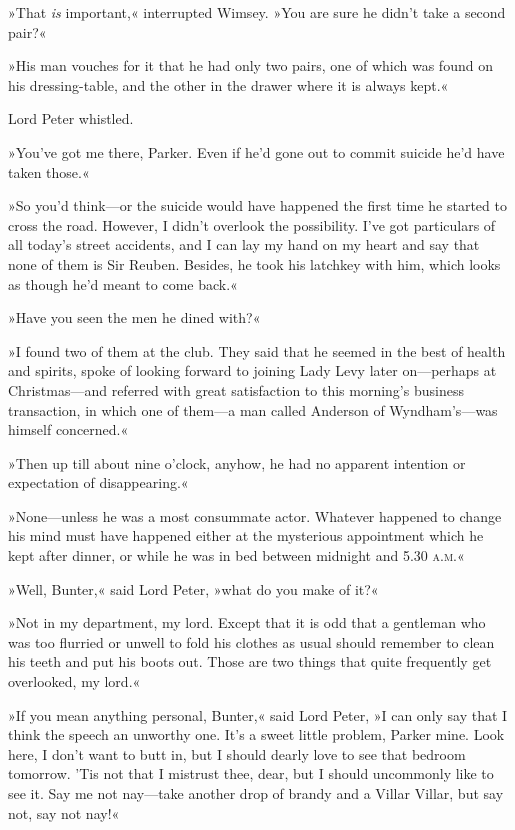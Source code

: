 »That \textit{is} important,« interrupted Wimsey. »You are sure he didn't take a second pair?«

»His man vouches for it that he had only two pairs, one of which was found on his dressing-table, and the other in the drawer where it is always kept.«

Lord Peter whistled.

»You've got me there, Parker. Even if he'd gone out to commit suicide he'd have taken those.«

»So you'd think\allowbreak---\allowbreak or the suicide would have happened the first time he started to cross the road. However, I didn't overlook the possibility. I've got particulars of all today's street accidents, and I can lay my hand on my heart and say that none of them is Sir Reuben. Besides, he took his latchkey with him, which looks as though he'd meant to come back.«

»Have you seen the men he dined with?«

»I found two of them at the club. They said that he seemed in the best of health and spirits, spoke of looking forward to joining Lady Levy later on\allowbreak---\allowbreak perhaps at Christmas\allowbreak---\allowbreak and referred with great satisfaction to this morning's business transaction, in which one of them\allowbreak---\allowbreak a man called Anderson of Wyndham's\allowbreak---\allowbreak was himself concerned.«

»Then up till about nine o'clock, anyhow, he had no apparent intention or expectation of disappearing.«

»None\allowbreak---\allowbreak unless he was a most consummate actor. Whatever happened to change his mind must have happened either at the mysterious appointment which he kept after dinner, or while he was in bed between midnight and 5.30 \textsc{a.m.}«

»Well, Bunter,« said Lord Peter, »what do you make of it?«

»Not in my department, my lord. Except that it is odd that a gentleman who was too flurried or unwell to fold his clothes as usual should remember to clean his teeth and put his boots out. Those are two things that quite frequently get overlooked, my lord.«

»If you mean anything personal, Bunter,« said Lord Peter, »I can only say that I think the speech an unworthy one. It's a sweet little problem, Parker mine. Look here, I don't want to butt in, but I should dearly love to see that bedroom tomorrow. 'Tis not that I mistrust thee, dear, but I should uncommonly like to see it. Say me not nay\allowbreak---\allowbreak take another drop of brandy and a Villar Villar, but say not, say not nay!«

